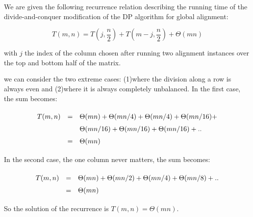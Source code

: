 
We are given the following recurrence relation describing the running time of the divide-and-conquer modification of the DP algorithm for global alignment:

\[
  T(m, n) = T(j, \frac{n}{2}) + T(m - j, \frac{n}{2}) + \Theta(mn)
\]

\noindent
with $j$ the index of the column chosen after running two alignment instances over the top and bottom half of the matrix.

we can consider the two extreme cases: (1)where the division along a row is always even and (2)where it is always completely unbalanced. In the first case, the sum becomes:

\[\def\arraystretch{1.5}
\begin{array}{l l l}
  T(m, n) & = & \Theta(mn) + \Theta(mn/4) + \Theta(mn/4) + \Theta(mn/16) +\\
          &   & \Theta(mn/16) + \Theta(mn/16) + \Theta(mn/16) + ..  \\
          & = & \Theta(mn)
\end{array}
\]

In the second case, the one column never matters, the sum becomes:

\[\def\arraystretch{1.5}
\begin{array}{l l l}
  T(m, n) & = & \Theta(mn) + \Theta(mn/2) + \Theta(mn/4) + \Theta(mn/8) + ..  \\
          & = & \Theta(mn)
\end{array}
\]

So the solution of the recurrence is $T(m, n) = \Theta(mn)$.
